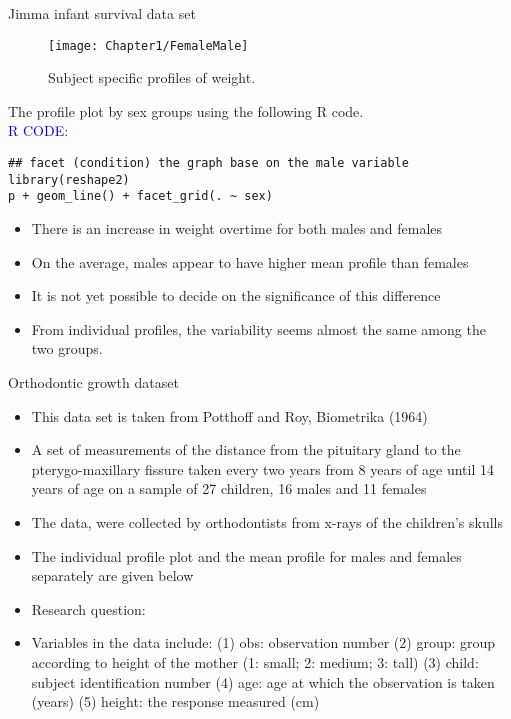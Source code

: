 \documentclass{beamer}
\begin{document}
\begin{frame}{Jimma infant survival data set}
\begin{figure}[h!]
	\centering
	\texttt{[image: Chapter1/FemaleMale]}
	\caption{Subject specific profiles of weight. \label{Profile by sex}}
\end{figure}
\end{frame}

\begin{frame}[fragile]
The profile plot by sex groups using the following R code. \\
\vspace{1cm}
\textcolor{blue}{R CODE:} \scriptsize\begin{verbatim}
## facet (condition) the graph base on the male variable
library(reshape2)
p + geom_line() + facet_grid(. ~ sex)
\end{verbatim}
\end{frame}

\begin{frame}
\begin{itemize}
	\item There is an increase in weight overtime for both males and females \vspace{0.25cm}
	\item On the average, males appear to have higher mean profile than females \vspace{0.25cm}
	\item It is not yet possible to decide on the significance of this difference \vspace{0.25cm}
	\item From individual profiles, the variability seems almost the same among the two groups.
\end{itemize}
\end{frame}


\begin{frame}{Orthodontic growth dataset}
\begin{itemize}
	\item This data set is taken from Potthoff and Roy, Biometrika (1964)
	\item A set of measurements of the distance from the pituitary gland to the pterygo-maxillary fissure taken every two years from 8 years of age until 14 years of age on a sample of 27 children, 16 males and 11 females
	\item The data, were collected by orthodontists from x-rays of the children’s skulls
	\item The individual profile plot and the mean profile for males and females separately are given below
	\item Research question: {\color{red}{Is dental growth related to gender?}}
	\item  Variables in the data include: (1) obs: observation number (2) group: group according to height of the mother (1: small; 2: medium; 3: tall) (3) child: subject identification number (4) age: age at which the observation is taken (years) (5) height: the response measured (cm)
\end{itemize}
\end{frame}
\end{document}
